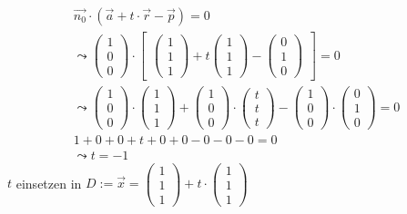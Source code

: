 \begin{gather}
\vec{n_0} \cdot (\vec{a}+t\cdot \vec{r}-\vec{p})=0\\
\leadsto 
\begin{pmatrix}
1\\0\\0
\end{pmatrix} \cdot 
\begin{bmatrix}
\begin{pmatrix}
1\\1\\1
\end{pmatrix}
+ t
\begin{pmatrix}
1\\1\\1
\end{pmatrix}
-
\begin{pmatrix}
0\\1\\0
\end{pmatrix}
\end{bmatrix} = 0\\
\leadsto
\begin{pmatrix}
1\\0\\0
\end{pmatrix}\cdot
\begin{pmatrix}
1\\1\\1
\end{pmatrix}
+
\begin{pmatrix}
1\\0\\0
\end{pmatrix}
\cdot
\begin{pmatrix}
t\\t\\t
\end{pmatrix}
-
\begin{pmatrix}
1\\0\\0
\end{pmatrix}
\cdot
\begin{pmatrix}
0\\1\\0
\end{pmatrix} =0\\
1+0+0+t+0+0-0-0-0=0\\
\leadsto t=-1
\end{gather} 
\ensuremath{t} einsetzen in \ensuremath{D:= \vec{x}=\begin{pmatrix}
		1\\1\\1
	\end{pmatrix} +t\cdot\begin{pmatrix}
		1\\1\\1
\end{pmatrix}}
